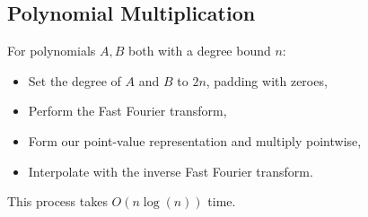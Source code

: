 \newpage

\subsection{Polynomial Multiplication}

For polynomials $A, B$ both with a degree bound $n$: \begin{itemize}
  \item Set the degree of $A$ and $B$ to $2n$, padding with zeroes,
  \item Perform the Fast Fourier transform,
  \item Form our point-value representation and multiply pointwise,
  \item Interpolate with the inverse Fast Fourier transform.
\end{itemize} This process takes $O(n \log(n))$ time.